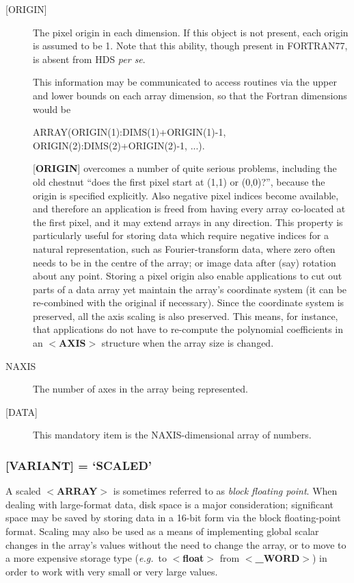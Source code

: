 \documentclass[twoside,11pt,nolof,noabs]{starlink}
\begin{document}
\begin{description}
\item [{[}ORIGIN{]}]
The pixel origin in each dimension.  If this object is not present,
each origin is assumed to be 1.  Note that this
ability, though present in FORTRAN77, is
absent from HDS \textit{per se}.

This information may be communicated to
access routines via the upper and lower bounds on each array dimension,
so that the Fortran dimensions would be
\begin{terminalv}
    ARRAY(ORIGIN(1):DIMS(1)+ORIGIN(1)-1, ORIGIN(2):DIMS(2)+ORIGIN(2)-1, ...).
\end{terminalv}

{[}\textbf{ORIGIN}{]} overcomes a number of quite serious problems,
including the old chestnut ``does the first pixel start at (1,1) or
(0,0)?'', because the origin is specified explicitly. Also negative
pixel indices become available, and therefore an application is freed
from having every array co-located at the first pixel, and it may extend
arrays in any direction. This property is particularly useful for
storing data which require negative indices for a natural
representation, such as Fourier-transform data, where zero often needs to
be in the centre of the array; or image data after (say) rotation about
any point.  Storing a pixel origin also enable applications to cut out parts
of a data array yet maintain the array's coordinate system (it can be
re-combined with the original if necessary). Since the coordinate
system is preserved, all the axis scaling is also preserved. This means,
for instance, that applications do not have to re-compute the polynomial
coefficients in an $<$\textbf{AXIS}$>$ structure when the array size is
changed.
\item [NAXIS]
The number of axes in the array being represented.
\item [{[}DATA{]}]
This mandatory item is the NAXIS-dimensional array of numbers.
\end{description}

\subsubsection{{[}\textbf{VARIANT}{]} = `SCALED'}
A scaled \mbox{$<$\textbf{ARRAY}$>$} is sometimes referred
to as \textit{block floating point}.
When dealing with large-format data, disk space is a major
consideration; significant space may be saved by storing data in a
16-bit form via the block floating-point format.  Scaling may also be
used as a means of implementing global scalar changes in the array's
values without the need to change the array, or to move to a more
expensive storage type (\textit{e.g.}\  to $<$\textbf{float}$>$ from
$<$\textbf{\_WORD}$>$) in order to work with very small or very large values.
\end{document}

